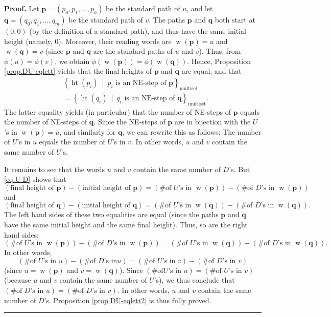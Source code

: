 \documentclass[numbers=enddot,12pt,final,onecolumn,notitlepage]{scrartcl}%
\theoremstyle{definition}
\newenvironment{proof}[1][Proof]{\noindent\textbf{#1.} }{\ \rule{0.5em}{0.5em}}
\newcommand{\pp}{\mathbf{p}}
\newcommand{\qq}{\mathbf{q}}
\newcommand{\w}{\operatorname{w}}
\newcommand{\htt}{\operatorname{ht}}
\newcommand{\multiset}{\operatorname{multiset}}
\newcommand{\tup}[1]{\left( #1 \right)}
\begin{document}
\begin{proof}
Let $\pp=\left(  p_{0},p_{1},\ldots,p_{k}\right)  $ be the standard path of $u$, and let $\qq=\left(  q_{0},q_{1},\ldots
,q_{m}\right)  $ be the standard path of $v$.
The paths $\pp$ and $\qq$ both start at $\tup{0,0}$ (by the definition of a standard path), and thus have the same initial height (namely, $0$).
Moreover, their reading words are $\w\tup{\pp} = u$ and $\w\tup{\qq} = v$ (since $\pp$ and $\qq$ are the standard paths of $u$ and $v$).
Thus, from $\phi\left(  u\right)  =\phi\left(  v\right)  $, we obtain
$\phi\left(  \w\left(  \pp\right)  \right)  =\phi\left(
\w\left(  \qq\right)  \right)  $.
Hence, Proposition \ref{prop.DU-eqlett} yields
that the final heights of $\pp$ and $\qq$ are equal, and that
\begin{align*}
&  \left\{  \htt\left(  p_{i}\right)  \ \mid\ p_{i}\text{ is an
NE-step of }\pp\right\}  _{\multiset}\\
&  =\left\{  \htt\left(  q_{i}\right)  \ \mid\ q_{i}\text{ is an
NE-step of }\qq\right\}  _{\multiset}.
\end{align*}
The latter equality yields (in particular) that the number of NE-steps of
$\pp$ equals the number of NE-steps of $\qq$. Since the NE-steps
of $\pp$ are in bijection with the $U$'s in $\w\left(
\pp\right)  =u$, and similarly for $\qq$, we can rewrite this as
follows: The number of $U$'s in $u$ equals the number of $U$'s in $v$. In
other words, $u$ and $v$ contain the same number of $U$'s.

It remains to see that the words $u$ and $v$ contain the same number of $D$'s.
But \eqref{eq.U-D} shows that%
\[
\left(  \text{final height of }\pp\right)  -\left(  \text{initial height of }\pp\right)
=\left(  \text{\# of $U$'s in }\w\left(  \pp\right)  \right)
-\left(  \text{\# of $D$'s in }\w\left(  \pp\right)  \right)
\]
and
\[
\left(  \text{final height of }\qq\right)
-\left(  \text{initial height of }\qq\right)
=\left(  \text{\# of $U$'s in }\w\left(  \qq\right)  \right)
-\left(  \text{\# of $D$'s in }\w\left(  \qq\right)  \right)  .
\]
The left hand sides of these two equalities are equal (since the paths
$\pp$ and $\qq$ have the same initial height and the same final
height). Thus, so are the right hand sides:%
\[
\left(  \text{\# of $U$'s in }\w\left(  \pp\right)
\right)  -\left(  \text{\# of $D$'s in }\w\left(  \pp%
\right)  \right)  =\left(  \text{\# of $U$'s in }\w\left(
\qq\right)  \right)  -\left(  \text{\# of $D$'s in }\w%
\left(  \qq\right)  \right)  .
\]
In other words,%
\[
\left(  \text{\# of $U$'s in }u\right)  -\left(  \text{\# of $D$'s in
}u\right)  =\left(  \text{\# of $U$'s in }v\right)  -\left(  \text{\# of $D$'s
in }v\right)
\]
(since $u=\w\left(  \pp\right)  $ and
$v=\w\left(  \qq\right)  $). Since $\left(  \text{\# of
$U$'s in }u\right)  =\left(  \text{\# of $U$'s in }v\right)  $ (because $u$
and $v$ contain the same number of $U$'s), we thus conclude that $\left(
\text{\# of $D$'s in }u\right)  =\left(  \text{\# of $D$'s in }v\right)  $. In
other words, $u$ and $v$ contain the same number of $D$'s. Proposition
\ref{prop.DU-eqlett2} is thus fully proved.
\end{proof}
\end{document}
